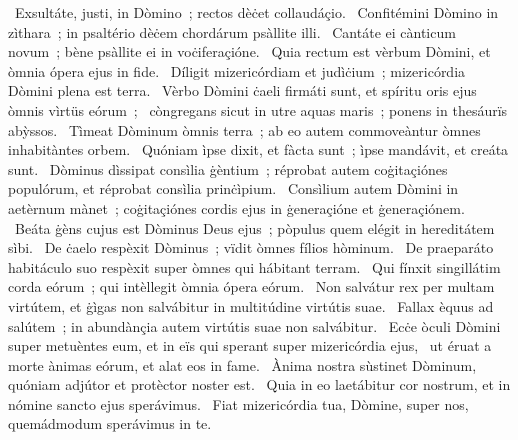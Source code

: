 \psalmChapterWithInscription{}
{ }
{%
~Exsultáte, justi, in Dòmino~; rectos dèċet collaudáçio. 
~Confitémini Dòmino in zìthara~; in psaltério dèċem chordárum psàllite illi. 
~Cantáte ei cànticum novum~; bène psàllite ei in voċiferaçióne. 
~Quia rectum est vèrbum Dòmini, et òmnia ópera ejus in fide. 
~Díligit mizericórdiam et judìċium~; mizericórdia Dòmini plena est terra. 
~Vèrbo Dòmini ċaeli firmáti sunt, et spíritu oris ejus òmnis vìrtüs eórum~; 
~còngregans sicut in utre aquas maris~; ponens in thesáurïs abỳssos. 
~Tìmeat Dòminum òmnis terra~; ab eo autem commoveàntur òmnes inhabitàntes orbem. 
~Quóniam ìpse dixit, et fàcta sunt~; ìpse mandávit, et creáta sunt. 
~Dòminus dìssipat consìlia ġèntium~; réprobat autem coġitaçiónes populórum, et réprobat consìlia prinċìpium. 
~Consìlium autem Dòmini in aetèrnum mànet~; coġitaçiónes cordis ejus in ġeneraçióne et ġeneraçiónem. 
~Beáta ġèns cujus est Dòminus Deus ejus~; pòpulus quem elégit in hereditátem sìbi. 
~De ċaelo respèxit Dòminus~; vïdit òmnes fílios hòminum. 
~De praeparáto habitáculo suo respèxit super òmnes qui hábitant terram. 
~Qui fínxit singillátim corda eórum~; qui intèllegit òmnia ópera eórum. 
~Non salvátur rex per multam virtútem, et ġìgas non salvábitur in multitúdine virtútis suae. 
~Fallax èquus ad salútem~; in abundànçia autem virtútis suae non salvábitur. 
~Ecċe òculi Dòmini super metuèntes eum, et in eïs qui sperant super mizericórdia ejus, 
~ut éruat a morte ànimas eórum, et alat eos in fame. 
~Ànima nostra sùstinet Dòminum, quóniam adjútor et protèctor noster est. 
~Quia in eo laetábitur cor nostrum, et in nómine sancto ejus sperávimus. 
~Fiat mizericórdia tua, Dòmine, super nos, quemádmodum sperávimus in te. 
}
